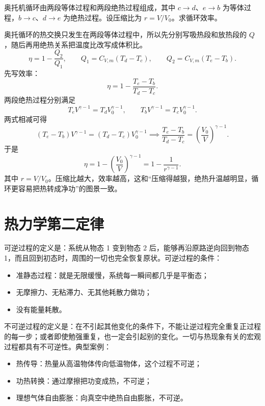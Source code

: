\documentclass[lang=cn,11pt]{elegantbook}
\begin{document}
\begin{exercise}[奥托循环效率]
奥托机循环由两段等体过程和两段绝热过程组成，其中 \(c\to d\)、\(e\to b\) 为等体过程，\(b\to c\)、\(d\to e\) 为绝热过程。设压缩比为 \(r=V/V_0\)。求循环效率。
\end{exercise}

\begin{solution}
奥托循环的热交换只发生在两段等体过程中，所以先分别写吸热段和放热段的 \(Q\)，随后再用绝热关系把温度比改写成体积比。
 \[\eta=1-\frac{Q_2}{Q_1},\qquad Q_1=C_{V,m}(T_d-T_c),\qquad Q_2=C_{V,m}(T_e-T_b).\]
先写效率：
 \[\eta=1-\frac{T_e-T_b}{T_d-T_c}.\]
两段绝热过程分别满足
 \[T_eV^{\gamma-1}=T_dV_0^{\gamma-1},\qquad T_bV^{\gamma-1}=T_cV_0^{\gamma-1}.\] 
两式相减可得
\[
(T_e-T_b)V^{\gamma-1}=(T_d-T_c)V_0^{\gamma-1}
\implies
\frac{T_e-T_b}{T_d-T_c}=\left(\frac{V_0}{V}\right)^{\gamma-1}.
\]
于是
 \[\eta=1-\left(\frac{V_0}{V}\right)^{\gamma-1} =1-\frac{1}{r^{\gamma-1}}.\]
其中 \(r=V/V_0\)。压缩比越大，效率越高，这和“压缩得越狠，绝热升温越明显，循环更容易把热转成净功”的图景一致。
\end{solution}




\chapter{热力学第二定律}


\begin{definition}
    可逆过程的定义是：系统从物态 1 变到物态 2 后，能够再沿原路逆向回到物态 1，而且回到初态时，周围的一切也完全恢复原状。可逆过程的条件：
    \begin{itemize}
    \item 准静态过程：就是无限缓慢，系统每一瞬间都几乎是平衡态；
    \item 无摩擦力、无粘滞力、无其他耗散力做功；
    \item 没有能量耗散。
    \end{itemize}
    不可逆过程的定义是：在不引起其他变化的条件下，不能让逆过程完全重复正过程的每一步；或者即使勉强重复，也一定会引起别的变化。一切与热现象有关的宏观过程都具有不可逆性。典型案例：
    \begin{itemize}
    \item 热传导：热量从高温物体传向低温物体，这个过程不可逆；
    \item 功热转换：通过摩擦把功变成热，不可逆；
    \item 理想气体自由膨胀：向真空中绝热自由膨胀，不可逆。
    \end{itemize}
\end{definition}
\end{document}
